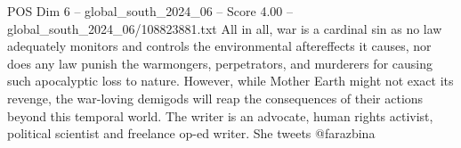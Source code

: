 \begin{textsample}{POS Dim 6 – global\_south\_2024\_06 – Score 4.00 – global\_south\_2024\_06/108823881.txt}
All in all, war is a cardinal sin as no law adequately monitors and controls the environmental aftereffects it causes, nor does any law punish the warmongers, perpetrators, and murderers for causing such apocalyptic loss to nature.
However, while Mother Earth might not exact its revenge, the war-loving demigods will reap the consequences of their actions beyond this temporal world.
The writer is an advocate, human rights activist, political scientist and freelance op-ed writer.
She tweets @farazbina

\end{textsample}
